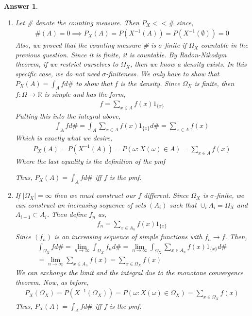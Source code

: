 \documentclass[12pt]{article}
\theoremstyle{colon}
\newtheorem*{answer}{Answer}
\begin{document}
\begin{answer}
  \leavevmode
  \begin{enumerate}[label=\arabic*)]
    \item Let \# denote the counting measure. Then $P_X << \#$ since,
      \begin{gather*}
        \#(A) = 0 \implies P_X(A) = P(X^{-1}(A)) = P(X^{-1}(\emptyset)) = 0
      \end{gather*}
      Also, we proved that the counting measure \# is $\sigma$-finite if $\Omega_X$ countable in the previous question. Since it is finite, it is countable. By Radon-Nikodym theorem, if we restrict ourselves to $\Omega_X$, then we know a density exists. In this specific case, we do not need $\sigma$-finiteness. We only have to show that $P_X(A) = \int_A f d\#$ to show that $f$ is the density. Since $\Omega_X$ is finite, then $f: \Omega \rightarrow \mathbb{R}$ is simple and has the form,
      \begin{gather*}
        f = \sum\limits_{x \in A} f(x) 1_{\{ x \}}
      \end{gather*}
      Putting this into the integral above,
      \begin{gather*}
        \int_A f d\# = \int_A \sum\limits_{x \in A} f(x) 1_{\{ x \}} d\# = \sum\limits_{x \in A} f(x)
      \end{gather*}
      Which is exactly what we desire,
      \begin{gather*}
        P_X(A) = P(X^{-1}(A)) = P(\omega : X(\omega) \in A) = \sum\limits_{x \in A} f(x)
      \end{gather*}
      Where the last equality is the definition of the pmf

      Thus, $P_X(A) = \int_A f d\#$ iff $f$ is the pmf.
    \item If $\lvert \Omega_X \rvert = \infty$ then we must construct our $f$ different. Since $\Omega_X$ is $\sigma$-finite, we can construct an increasing sequence of sets $(A_i)$ such that $\cup_{i} A_i = \Omega_X$ and $A_{i-1} \subset A_i$. Then define $f_n$ as,
      \begin{gather*}
        f_n = \sum_{x \in A_n} f(x)1_{\{ x \}}
      \end{gather*}
      Since $(f_n)$ is an increasing sequence of simple functions with $f_n \rightarrow f$. Then,
      \begin{gather*}
        \int_{\Omega_X} f d\# = \lim_{n \rightarrow \infty} \int_{\Omega_X} f_n d\# = \lim_{n \rightarrow \infty} \int_{\Omega_X} \sum\limits_{x \in A_n} f(x) 1_{\{ x \}} d\# \\
        = \lim_{n \rightarrow \infty} \sum\limits_{x \in A_n} f(x) = \sum\limits_{x \in \Omega_X} f(x)
      \end{gather*}
      We can exchange the limit and the integral due to the monotone convergence theorem. Now, as before,
      \begin{gather*}
        P_X(\Omega_X) = P(X^{-1}(\Omega_X)) = P(\omega : X(\omega) \in \Omega_X) = \sum\limits_{x \in \Omega_X} f(x)
      \end{gather*}
      Thus, $P_X(A) = \int_A f d\#$ iff $f$ is the pmf.
  \end{enumerate}
\end{answer}
\end{document}
